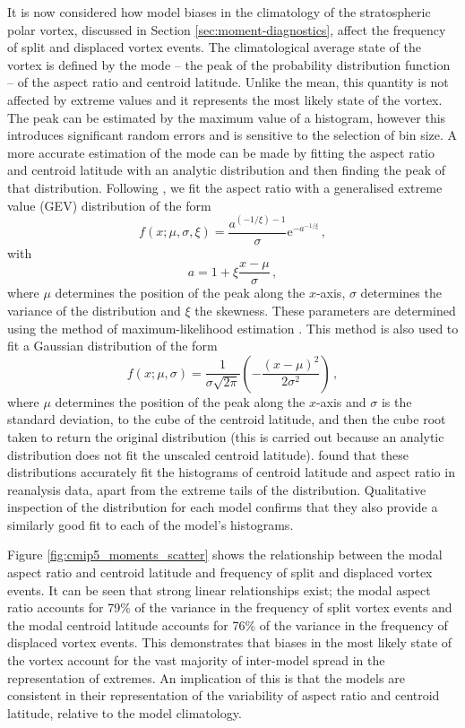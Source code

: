\bigskip It is now considered how model biases in the climatology of the
stratospheric polar vortex, discussed in Section \ref{sec:moment-diagnostics},
affect the frequency of split and displaced vortex events. The climatological
average state of the vortex is defined by the mode -- the peak of the
probability distribution function -- of the aspect ratio and centroid
latitude. Unlike the mean, this quantity is not affected by extreme values and
it represents the most likely state of the vortex. The peak can be estimated by
the maximum value of a histogram, however this introduces significant random
errors and is sensitive to the selection of bin size. A more accurate estimation
of the mode can be made by fitting the aspect ratio and centroid latitude with
an analytic distribution and then finding the peak of that
distribution. Following \citet{Mitchell2011}, we fit the aspect ratio with a
generalised extreme value (GEV) distribution of the form
\begin{equation}
  f(x;\mu,\sigma,\xi) = \frac{a^{(-1/\xi)-1}}{\sigma}\mathrm{e}^{{-a}^{-1/\xi}}
  \, , 
\end{equation}
with
\begin{equation} 
a = 1 + \xi \frac{x-\mu}{\sigma} \, ,
\end{equation}
where $\mu$ determines the position of the peak along the $x$-axis, $\sigma$
determines the variance of the distribution and $\xi$ the skewness. These
parameters are determined using the method of maximum-likelihood estimation
\citep{Wilks}. This method is also used to fit a Gaussian distribution of the
form
\begin{equation}
f(x;\mu,\sigma) = \frac{1}{\sigma\sqrt{2\pi}} \left(
  -\frac{(x-\mu)^2}{2\sigma^{2}} \right) \, ,
\end{equation}
where $\mu$ determines the position of the peak along the $x$-axis and $\sigma$
is the standard deviation, to the cube of the centroid latitude, and then the
cube root taken to return the original distribution (this is carried out because
an analytic distribution does not fit the unscaled centroid
latitude). \citet{Mitchell2011} found that these distributions accurately fit
the histograms of centroid latitude and aspect ratio in reanalysis data, apart
from the extreme tails of the distribution. Qualitative inspection of the
distribution for each model confirms that they also provide a similarly good fit
to each of the model's histograms.

Figure \ref{fig:cmip5_moments_scatter} shows the relationship between the modal
aspect ratio and centroid latitude and frequency of split and displaced vortex
events. It can be seen that strong linear relationships exist; the modal aspect
ratio accounts for 79\% of the variance in the frequency of split vortex events
and the modal centroid latitude accounts for 76\% of the variance in the
frequency of displaced vortex events. This demonstrates that biases in the most
likely state of the vortex account for the vast majority of inter-model spread
in the representation of extremes. An implication of this is that the models are
consistent in their representation of the variability of aspect ratio and
centroid latitude, relative to the model climatology.


